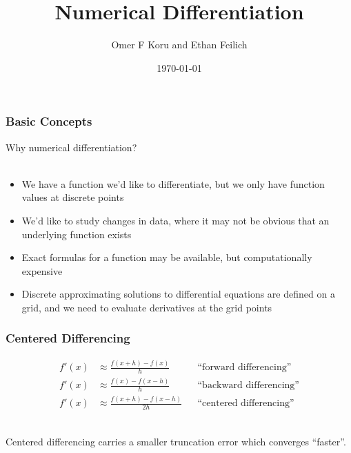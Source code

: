 \documentclass{beamer}
\title[Numerical Differentiation]{Numerical Differentiation}
\author{Omer F Koru and Ethan Feilich}
\institute{University of Pennsylvania}
\date{\today}
\begin{document}
\begin{frame}
  \titlepage
\end{frame}

\begin{frame}
\frametitle{Basic Concepts}

Why numerical differentiation?\\
\hfill\\

\begin{itemize}
\setlength\itemsep{1em}
\item We have a function we'd like to differentiate, but we only have function values at discrete points
\item We'd like to study changes in data, where it may not be obvious that an underlying function exists
\item Exact formulas for a function may be available, but computationally expensive
\item Discrete approximating solutions to differential equations are defined on a grid, and we need to evaluate derivatives at the grid points
\end{itemize}

\end{frame}

\begin{frame}
\frametitle{Centered Differencing}

\begin{align*}
f'(x) &\approx \frac{f(x+h) - f(x)}{h} & & \textrm{``forward differencing''}\\
f'(x) &\approx \frac{f(x) - f(x-h)}{h} & & \textrm{``backward differencing''}\\
f'(x) &\approx \frac{f(x+h) - f(x-h)}{2h}& & \textrm{``centered differencing''}
\end{align*}

\hfill\\

Centered differencing carries a smaller truncation error which converges ``faster''.


\end{frame}
\end{document}
